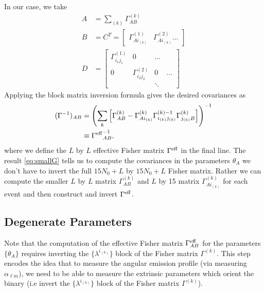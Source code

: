 \documentclass[aps,prd,amsmath,showpacs,amssymb,superscriptaddress,nofootinbib,longbibliography,eqsecnum,preprintnumbers]{revtex4-1}
\begin{document}
In our case, we take 
\begin{align}
A&=\sum_{(k)}\Gamma_{AB}^{(k)} \\
B&=C^T=
\begin{bmatrix}
\Gamma^{(1)}_{Ai_{(k)}} & \Gamma^{(2)}_{Ai_{(k)}} \dots
\end{bmatrix} \\
D&=
\begin{bmatrix}
 \Gamma^{(1)}_{i_1j_1} & 0 &\dots \\
 0 &\Gamma^{(2)}_{i_2j_2} & 0 &\dots \\
 & &\ddots 
\end{bmatrix}
\end{align}
Applying the block matrix inversion formula gives the desired covariances as
\begin{align}
(\Gamma^{-1})_{AB}&=\left(\sum_{{k}}\left[\Gamma_{AB}^{(k)}-\Gamma^{(k)}_{Ai_{(k)}}\Gamma^{(k)-1}_{i_{(k)}j_{(k)}}\Gamma^{(k)}_{j_{(k)}B}\right]\right)^{-1}  \nonumber \\
&\equiv {\Gamma^{\rm eff}}^{-1}_{AB}, \label{eq:smallG}
\end{align}
where we define the $L$ by $L$ effective Fisher matrix $\Gamma^{\rm eff}$ in the final line. The result \eqref{eq:smallG} tells us to compute the covariances in the parameters $\theta_A$ we don't have to invert the full $15 N_0 +L$ by $15 N_0 +L$ Fisher matrix. Rather we can compute the smaller $L$ by $L$ matrix $\Gamma_{AB}^{(k)}$ and $L$ by 15 matrix $\Gamma_{Ai_{(k)}}^{(k)}$ for each event and then construct and invert $\Gamma^{\rm eff}$.

\subsection{Degenerate Parameters}
\label{sec:deg}
Note that the computation of the effective Fisher matrix $\Gamma^{\rm eff}_{AB}$ for the parameters $\{\theta_A\}$ requires inverting the $\{\lambda^{i_{(k)}}\}$ block of the Fisher matrix $\Gamma^{(k)}$. This step encodes the idea that to measure the angular emission profile (via measuring $\alpha_{\ell m}$), we need to be able to measure  the extrinsic parameters which orient the binary (i.e invert the  $\{\lambda^{i_{(k)}}\}$ block of the Fisher matrix $\Gamma^{(k)}$). 
\end{document}
